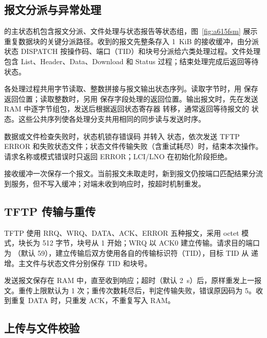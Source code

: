 \subsection{报文分派与异常处理}

 的主状态机包含报文分派、文件处理与状态报告等状态组，图~\ref{fig:a615fsm} 展示重复数据块的关键分派路径。收到的报文先整条存入 1~KiB 的接收缓冲，由分派状态 DISPATCH 按操作码、端口（TID）和块号分派给六类处理过程。文件处理包含 List、Header、Data、Download 和 Status 过程；结束处理完成后返回等待状态。

各处理过程共用字节读取、整数拼接与报文输出状态序列。读取字节时，用  保存返回位置；读取整数时，另用  保存字段处理的返回位置。输出报文时，先在发送 RAM 中逐字节组包，发送后根据返回状态寄存器  转移，通常返回等待报文的  状态。这些公共序列使各处理分支共用相同的同步读与发送时序。

数据或文件检查失败时，状态机锁存错误码  并转入  状态，依次发送 TFTP ERROR 和失败状态文件；状态文件传输失败（含重试耗尽）时，结束本次操作。请求名称或模式错误时只返回 ERROR；LCI/LNO 在初始化阶段拒绝。


接收缓冲一次保存一个报文。当前报文未取走时，新到报文仍按端口匹配结果分流到服务，但不写入缓冲；对端未收到响应时，按超时机制重发。

\subsection{TFTP 传输与重传}

TFTP 使用 RRQ、WRQ、DATA、ACK、ERROR 五种报文，采用 octet 模式，块长为 512 字节，块号从 1 开始；WRQ 以 ACK0 建立传输。请求目的端口为 （默认 59），建立传输后双方使用各自的传输标识符（TID），目标 TID 从  递增。主文件与状态文件分别保存 TID 和块号。

发送报文保存在 RAM 中，直至收到响应；超时（默认 2~s）后，原样重发上一报文。重传上限默认为 1 次；重传次数耗尽后，判定传输失败，错误原因码为 5。收到重复 DATA 时，只重发 ACK，不重复写入 RAM。

\subsection{上传与文件校验}

